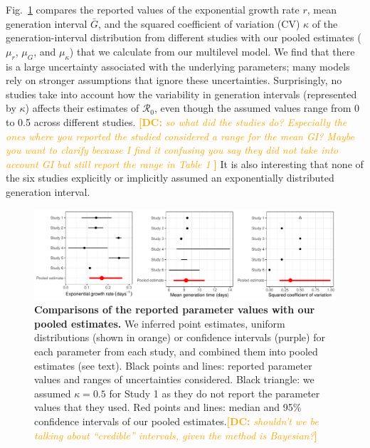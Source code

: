 \documentclass[12pt]{article}
\newcommand{\fref}[1]{Fig.~\ref{fig:#1}}
\newcommand{\comment}[3]{\textcolor{#1}{\textbf{[#2: }\textsl{#3}\textbf{]}}}
\newcommand{\dc}[1]{\comment{Orange}{DC}{#1}}
\begin{document}
\fref{assumption} compares the reported values of the exponential growth rate $r$, mean generation interval $\bar G$, and the squared coefficient of variation (CV) $\kappa$ of the generation-interval distribution from different studies with our pooled estimates ($\mu_r$, $\mu_G$, and $\mu_\kappa$) that we calculate from our multilevel model.
We find that there is a large uncertainty associated with the underlying parameters;
many models rely on stronger assumptions that ignore these uncertainties.
Surprisingly, no studies take into account how the variability in generation intervals (represented by $\kappa$) affects their estimates of $\mathcal R_0$, even though the assumed values range from 0 to 0.5 across different studies.
\dc{so what did the studies do? Especially the ones where you reported the studied considered a range for the mean GI? Maybe you want to clarify because I find it confusing you say they did not take into account GI but still report the range in Table 1 }
It is also interesting that none of the six studies explicitly or implicitly assumed an exponentially distributed generation interval.

\begin{figure}[t]
\includegraphics[width=\textwidth]{compare_assumption.pdf}
\caption{
\textbf{Comparisons of the reported parameter values with our pooled estimates.}
We inferred point estimates, uniform distributions (shown in orange) or confidence intervals (purple) for each parameter from each study, and combined them into pooled estimates (see text).
Black points and lines: reported parameter values and ranges of uncertainties considered.
Black triangle: we assumed $\kappa=0.5$ for Study 1 as they do not report the parameter values that they used.
Red points and lines: median and 95\% confidence intervals of our pooled estimates.\dc{shouldn't we be talking about ``credible'' intervals, given the method is Bayesian?}
}
\label{fig:assumption}
\end{figure}
\end{document}
